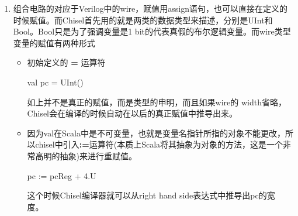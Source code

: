 \documentclass{article}
\begin{document}
\begin{enumerate}
	\item 组合电路的对应于Verilog中的wire，赋值用assign语句，也可以直接在定义的时候赋值。而Chisel首先用的就是两类的数据类型来描述，分别是UInt和Bool。Bool只是为了强调变量是1 bit的代表真假的布尔逻辑变量。而wire类型变量的赋值有两种形式
	\begin{itemize}
		\item 初始定义的 \textbf{=} 运算符 
		\begin{scala} 
			val pc = UInt() 
		\end{scala}
		
		如上并不是真正的赋值，而是类型的申明，而且如果wire的 width省略，Chisel会在编译的时候自动在以后的真正赋值中推导出来。
		\item 因为val在Scala中是不可变量，也就是变量名指针所指的对象不能更改，所以chisel中引入\textbf{:=}运算符(本质上Scala将其抽象为对象的方法，这是一个非常高明的抽象)来进行重赋值。
		\begin{scala} 
			pc := pcReg + 4.U 
		\end{scala}
		
		这个时候Chisel编译器就可以从right hand side表达式中推导出pc的宽度。~\cite{chisel}
		

\end{itemize}
\end{enumerate}
\end{document}
